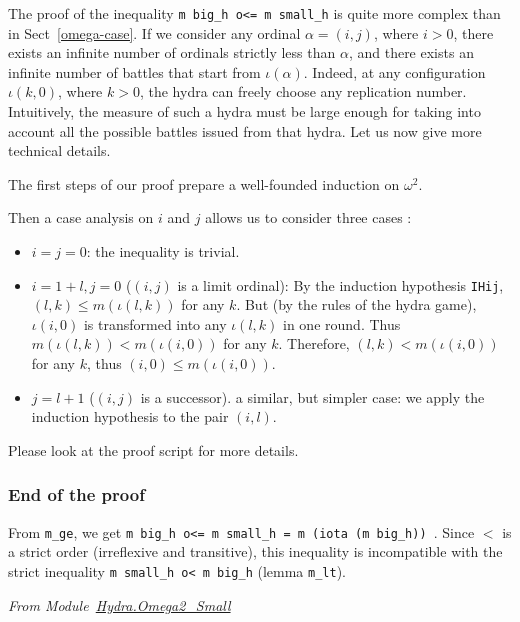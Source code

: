 The proof of the inequality \texttt{m big\_h o<= m small\_h} is quite more complex than in Sect~\ref{omega-case}.  If we consider any ordinal $\alpha=(i,j)$, where $i>0$, there exists an infinite number of
ordinals strictly less than $\alpha$, and there exists an infinite number of battles that start from
$\iota(\alpha)$. Indeed, at any configuration $\iota(k,0)$, where $k>0$, the hydra can freely choose any replication number. Intuitively, the measure of such a hydra must be large enough for taking into account
all the possible battles issued from that hydra.
Let us now give more technical details.

The first steps of our proof prepare a well-founded induction on $\omega^2$.





Then a case analysis on $i$ and $j$ allows us to
consider three cases :

\begin{itemize}
\item $i=j=0$: the inequality is trivial.
\item $i=1+l, j=0$ ($(i,j)$ is a limit ordinal): By the induction hypothesis \texttt{IHij},
  $(l,k)\leq m(\iota(l,k))$ for any $k$. But (by the rules of the hydra game), $\iota(i,0)$ is transformed into any $\iota(l,k)$ in one round. Thus $m(\iota(l,k)) < m(\iota(i,0))$ for any $k$.
  Therefore, $(l,k) <  m(\iota(i,0))$ for any $k$, thus
  $(i,0) \leq m(\iota(i,0))$.
 \item $j= l+1$  ($(i,j)$ is a successor).  a similar, but simpler case: we apply the induction hypothesis to the pair $(i,l)$.
 \end{itemize}

 Please look at the proof script for more details.
 
 

\subsubsection{End of the proof}
From \texttt{m\_ge}, we get \texttt{m big\_h o<= m small\_h = m (iota (m big\_h)) }. 
Since $<$ is a strict order (irreflexive  and transitive), this inequality is incompatible with the strict inequality  \texttt{m small\_h o< m big\_h} (lemma \texttt{m\_lt}).


\vspace{4pt}
\noindent
\emph{From Module~\href{../theories/html/hydras.Hydra.Omega2_Small.html\#Impossible}{Hydra.Omega2\_Small}}


